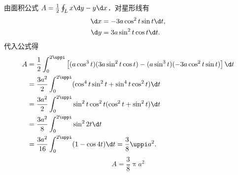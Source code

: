 \begin{solution}

    \begin{center}
    \end{center}
    由面积公式 $A = \frac{1}{2} \oint_L x \d y - y \d x$．对星形线有
    \begin{equation}\label{eq:astroid-diff}
        \begin{aligned}
            \d x & = -3a \cos^2 t \sin t \d t, \\
            \d y & = 3a \sin^2 t \cos t \d t.
        \end{aligned}
    \end{equation}
    代入公式得
    \begin{equation}\label{eq:astroid-calc}
        \begin{aligned}
            A & = \frac{1}{2} \int_0^{2\uppi} \left[ (a \cos^3 t)(3a \sin^2 t \cos t) - (a \sin^3 t)(-3a \cos^2 t \sin t) \right] \d t \\
              & = \frac{3a^2}{2} \int_0^{2\uppi} (\cos^4 t \sin^2 t + \sin^4 t \cos^2 t) \d t                                          \\
              & = \frac{3a^2}{2} \int_0^{2\uppi} \sin^2 t \cos^2 t (\cos^2 t + \sin^2 t) \d t                                          \\
              & = \frac{3a^2}{8} \int_0^{2\uppi} \sin^2 2t \d t                                                                        \\
              & = \frac{3a^2}{16} \int_0^{2\uppi} (1 - \cos 4t) \d t = \frac{3}{8} \uppi a^2.
        \end{aligned}
    \end{equation}
    \begin{equation}
        A = \boxed{\frac{3}{8} \uppi a^2}
    \end{equation}



\end{solution}
